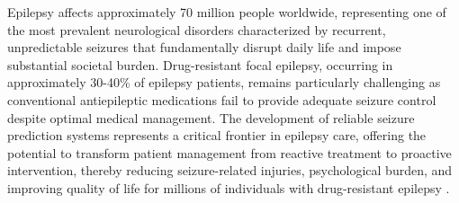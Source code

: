 
Epilepsy affects approximately 70 million people worldwide, representing one of the most prevalent neurological disorders characterized by recurrent, unpredictable seizures that fundamentally disrupt daily life and impose substantial societal burden. Drug-resistant focal epilepsy, occurring in approximately 30-40\% of epilepsy patients, remains particularly challenging as conventional antiepileptic medications fail to provide adequate seizure control despite optimal medical management. The development of reliable seizure prediction systems represents a critical frontier in epilepsy care, offering the potential to transform patient management from reactive treatment to proactive intervention, thereby reducing seizure-related injuries, psychological burden, and improving quality of life for millions of individuals with drug-resistant epilepsy \cite{Kuhlmann2018SeizurePA,Freestone2015SeizurePSBF}.

